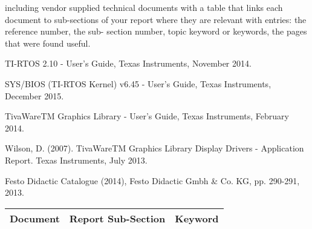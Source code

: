 \begin{thebibliography}{9}

 including vendor supplied technical documents with a table that links each document to sub-sections of your report where they are relevant with entries: the reference number, the sub- section number, topic keyword or keywords, the pages that were found useful.

TI-RTOS 2.10 - User's Guide, Texas Instruments, November 2014.

SYS/BIOS (TI-RTOS Kernel) v6.45 - User's Guide, Texas Instruments, December 2015.

TivaWareTM Graphics Library - User's Guide, Texas Instruments, February 2014.

Wilson, D. (2007). TivaWareTM Graphics Library Display Drivers - Application Report. Texas 
Instruments, July 2013.

Festo Didactic Catalogue (2014), Festo Didactic Gmbh \& Co. KG, pp. 290-291, 2013.
 
\end{thebibliography}

\begin{tabular}[width=pagewidth]{|l | l | l |}
	\hline
	Document & Report Sub-Section & Keyword \\
	\hline
\end{tabular}